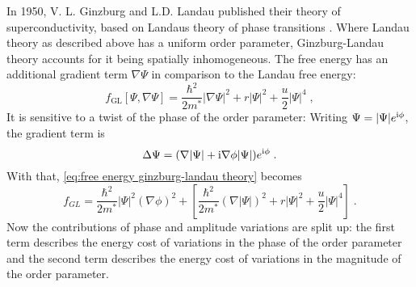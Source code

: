 \documentclass[../main.tex]{subfiles}
\begin{document}
In 1950, V. L. Ginzburg and L.D. Landau published their theory of superconductivity, based on Landaus theory of phase transitions \cite{ginzburgTheorySuperconductivity1950}.
Where Landau theory as described above has a uniform order parameter, Ginzburg-Landau theory accounts for it being spatially inhomogeneous.
The free energy has an additional gradient term \(\nabla \Psi\) in comparison to the Landau free energy:
\begin{equation}
	f_{\mathrm{GL}} [\Psi, \nabla \Psi] = \frac{\hbar^2}{2m^*} \vert \nabla \Psi \vert^2 + r \vert \Psi \vert^2 + \frac{u}{2} \vert \Psi \vert^4 \;,
	\label{eq:free energy ginzburg-landau theory}
\end{equation}
It is sensitive to a twist of the phase of the order parameter:
Writing \(\Psi = \vert \Psi \vert e^{\mathrm{i} \phi}\), the gradient term is
\begin{equation}
	\Delta \Psi = (\nabla \vert \Psi \vert + \mathrm{i} \nabla \phi \vert \Psi \vert) e^{\mathrm{i} \phi} \;.
\end{equation}
With that, \cref{eq:free energy ginzburg-landau theory} becomes
\begin{equation}
	f_{GL}  = \frac{\hbar^2}{2m^*} \vert \Psi \vert^2 (\nabla \phi)^2 + \left[ \frac{\hbar^2}{2m^*} (\nabla \vert \Psi \vert)^2 + r \vert \Psi \vert^2 + \frac{u}{2} \vert \Psi \vert^4 \right] \;.
	\label{eq:free energy ginzburg-landau theory with phase}
\end{equation}
Now the contributions of phase and amplitude variations are split up: the first term describes the energy cost of variations in the phase of the order parameter and the second term describes the energy cost of variations in the magnitude of the order parameter.
\end{document}
